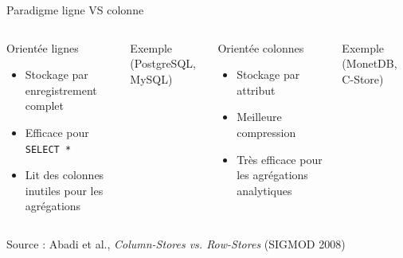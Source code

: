 \documentclass[a4paper,12pt]{beamer}
\begin{document}
\begin{frame}{Paradigme ligne VS colonne}
    \begin{columns}[T]
        \begin{block}{Orientée lignes}
            \footnotesize
            \begin{itemize}
                \item Stockage par enregistrement complet
                \item Efficace pour \texttt{SELECT *}
                \item Lit des colonnes inutiles pour les agrégations
            \end{itemize}
        \end{block}
        \vspace{0.2cm}
        \begin{exampleblock}{Exemple (PostgreSQL, MySQL)}
            \centering\scriptsize
        \end{exampleblock}

        \begin{block}{Orientée colonnes}
            \footnotesize
            \begin{itemize}
                \item Stockage par attribut
                \item Meilleure compression
                \item Très efficace pour les agrégations analytiques
            \end{itemize}
        \end{block}
        \vspace{0.2cm}
        \begin{exampleblock}{Exemple (MonetDB, C-Store)}
            \centering\scriptsize
        \end{exampleblock}
    \end{columns}
    \vfill
    {\tiny Source : Abadi et al., \textit{Column-Stores vs. Row-Stores} (SIGMOD 2008)}
\end{frame}
\end{document}
